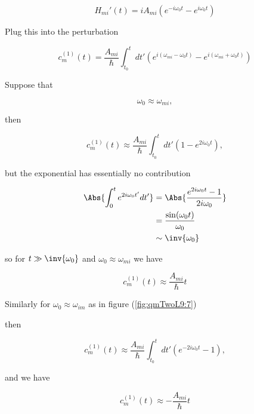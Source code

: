 {\begin{equation}\label{eqn:qmTwoL9:490}
H_{mi}'(t) = i A_{mi} 
\left( 
e^{-i \omega_0 t}
-e^{i \omega_0 t} 
\right)
\end{equation}

Plug this into the perturbation

\begin{equation}\label{eqn:qmTwoL9:510}
c_m^{(1)}(t) = 
\frac{A_{mi}}{\hbar} \int_{t_0}^t dt' 
\left( 
e^{i (\omega_{mi} - \omega_0 t) }
-e^{i (\omega_{mi} + \omega_0 t) }
\right)
\end{equation}


Suppose that

\begin{equation}\label{eqn:qmTwoL9:530}
\omega_0 \approx \omega_{mi},
\end{equation}

then

\begin{equation}\label{eqn:qmTwoL9:550}
c_m^{(1)}(t) \approx
\frac{A_{mi}}{\hbar} \int_{t_0}^t dt' 
\left( 
1
-e^{2 i \omega_0 t }
\right),
\end{equation}

but the exponential has essentially no contribution

\begin{align*}
\Abs{\int_0^t e^{2 i \omega_0 t'} dt' } 
&= 
\Abs{\frac{e^{2 i \omega_0 t} -1 }{2 i \omega_0}}  \\
&= 
\frac{\sin(\omega_0 t)}{\omega_0} \\
&\sim \inv{\omega_0}
\end{align*}

so for $t \gg \inv{\omega_0}$ and $\omega_0 \approx \omega_{mi}$ we have 

\begin{equation}\label{eqn:qmTwoL9:570}
c_m^{(1)}(t) \approx \frac{A_{mi}}{\hbar} t
\end{equation}

Similarly for $\omega_0 \approx \omega_{im}$ as in figure (\ref{fig:qmTwoL9:7}) 


then

\begin{equation}\label{eqn:qmTwoL9:590}
c_m^{(1)}(t) \approx
\frac{A_{mi}}{\hbar} \int_{t_0}^t dt' 
\left( 
e^{-2 i \omega_0 t }
-1
\right),
\end{equation}

and we have

\begin{equation}\label{eqn:qmTwoL9:610}
c_m^{(1)}(t) \approx -\frac{A_{mi}}{\hbar} t
\end{equation}
}

\shipoutAnswer

